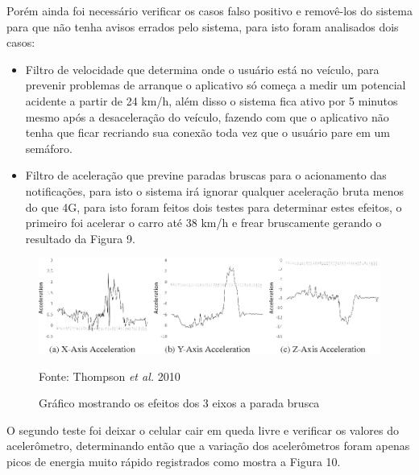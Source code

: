 Porém ainda foi necessário verificar os casos falso positivo e removê-los do sistema para que não tenha avisos errados pelo sistema, para isto foram analisados dois casos:

\begin{itemize}
    \item  Filtro de velocidade que determina onde o usuário está no veículo, para prevenir problemas de arranque o aplicativo só começa a medir um potencial acidente a partir de 24 km/h, além disso o sistema fica ativo por 5 minutos mesmo após a desaceleração do veículo, fazendo com que o aplicativo não tenha que ficar recriando sua conexão toda vez que o usuário pare em um semáforo.
\end{itemize}


\begin{itemize}
    \item  Filtro de aceleração que previne paradas bruscas para o acionamento das notificações, para isto o sistema irá ignorar qualquer aceleração bruta menos do que 4G, para isto foram feitos dois testes para determinar estes efeitos, o primeiro foi acelerar o carro até 38 km/h e frear bruscamente gerando o resultado da Figura 9.
    
\end{itemize}


 \begin{figure}[H]

 \caption{Gráfico mostrando os efeitos dos 3 eixos a parada brusca}
  \includegraphics[width=150mm]{images/Cap2/acelerometro_graficos.png}
  
    \scriptsize Fonte: Thompson \textit{et al.} 2010
    
\end{figure}



O segundo teste foi deixar o celular cair em queda livre e verificar os valores do acelerômetro, determinando então que a variação dos acelerômetros foram apenas picos de energia muito rápido registrados como mostra a Figura 10.




